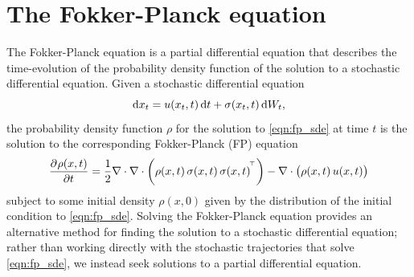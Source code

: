 
\section{The Fokker-Planck equation}\label{sec:disc_fp}
The Fokker-Planck equation is a partial differential equation that describes the time-evolution of the probability density function of the solution to a stochastic differential equation.
Given a stochastic differential equation
\begin{equation}
	\dif x_t = u\!\left(x_t,t\right)\dif t + \sigma\!\left(x_t,t\right)\dif W_t,
	\label{eqn:fp_sde}
\end{equation}
the probability density function \(\rho\) for the solution to \cref{eqn:fp_sde} at time \(t\) is the solution to the corresponding Fokker-Planck (FP) equation \citep{Risken_2012_FokkerPlanckEquationMethods}
\begin{equation}
	\dpd{\rho\!\left(x,t\right)}{t} = \frac12\nabla\cdot\nabla\cdot\left(\rho\!\left(x,t\right)\sigma\!\left(x,t\right)\sigma\!\left(x,t\right)^{\T}\right) - \nabla\cdot\left(\rho\!\left(x,t\right) u\!\left(x,t\right)\right)
	\label{eqn:fp_eqn}
\end{equation}
subject to some initial density \(\rho\!\left(x,0\right)\) given by the distribution of the initial condition to \cref{eqn:fp_sde}.
Solving the Fokker-Planck equation provides an alternative method for finding the solution to a stochastic differential equation; rather than working directly with the stochastic trajectories that solve \cref{eqn:fp_sde}, we instead seek solutions to a partial differential equation.
